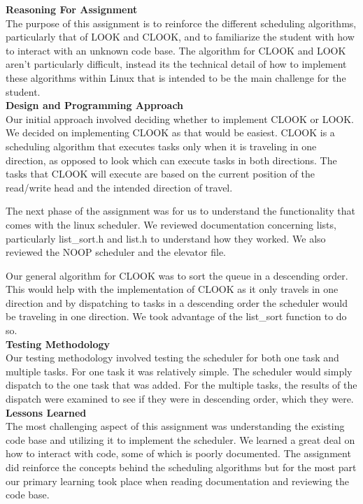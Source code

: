 \documentclass[letterpaper,10pt,draftclsnofoot,titlepage,onecolumn]{IEEEtran}
\begin{document}
	\textbf{Reasoning For Assignment}\\
	The purpose of this assignment is to reinforce the different scheduling algorithms, particularly that of LOOK and CLOOK, and to familiarize the student with how to interact with an unknown code base. The algorithm for CLOOK and LOOK aren't particularly difficult, instead its the technical detail of how to implement these algorithms within Linux that is intended to be the main challenge for the student.\\
		
	\textbf{Design and Programming Approach}\\
		Our initial approach involved deciding whether to implement CLOOK or LOOK. We decided on implementing CLOOK as that would be easiest. CLOOK is a scheduling algorithm that executes tasks only when it is traveling in one direction, as opposed to look which can execute tasks
		in both directions. The tasks that CLOOK will execute are based on the current position of the read/write head and the intended direction of travel. 
		
		The next phase of the assignment was for us to understand the functionality that comes with the linux scheduler. We reviewed documentation concerning lists, particularly list\_sort.h and list.h to understand how they worked. We also reviewed the NOOP scheduler and the elevator file.
		
		Our general algorithm for CLOOK was to sort the queue in a descending order. This would help with the implementation of CLOOK as it only travels in one direction and by dispatching to tasks in a descending order the scheduler would be traveling in one direction. We took advantage of the list\_sort function to do so. \\

	\textbf{Testing Methodology}\\
		Our testing methodology involved testing the scheduler for both one task and multiple tasks. For one task it was relatively simple. The scheduler would simply dispatch to the one task that was added. For the multiple tasks, the results of the dispatch were examined to see if they were in descending order, which they were. \\ 

	\textbf{Lessons Learned}\\
	The most challenging aspect of this assignment was understanding the existing code base and utilizing it to implement the scheduler. We learned a great deal on how to interact with code, some of which is poorly documented. The assignment did reinforce the concepts behind the scheduling algorithms but for the most part our primary learning took place when reading documentation and reviewing the code base.\\
\end{document}
